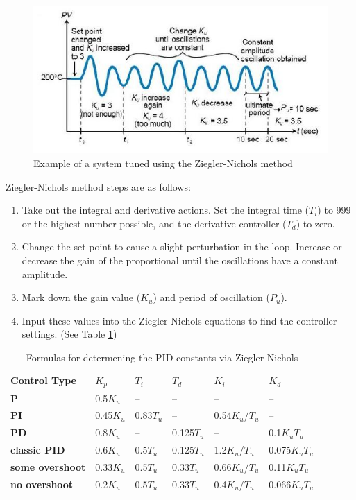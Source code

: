 \begin{figure}[H]
    \begin{center}
    \includegraphics[scale=0.7]{pictures/control/pidexample}
    \end{center}
    \caption{Example of a system tuned using the Ziegler-Nichols method\cite{LibrePID}}
    \label{fig:znmethod}
\end{figure}

Ziegler-Nichols method steps are as follows:
\begin{enumerate}
    \item 
    Take out the integral and derivative actions. Set the integral time ($T_i$) to 999 or the highest number possible, and the derivative controller ($T_d$) to zero.
    \item 
    Change the set point to cause a slight perturbation in the loop. Increase or decrease the gain of the proportional until the oscillations have a constant amplitude.
    \item 
    Mark down the gain value ($K_u$) and period of oscillation ($P_u$).
    \item 
    Input these values into the Ziegler-Nichols equations to find the controller settings. (See Table \ref*{table.pidconstants})
\end{enumerate}

\begin{table}[H]
    \begin{tabular}{llllll}
    \textbf{Control Type}   & $K_p$        & $T_i$     & $T_d$      & $K_i$           & $K_d$\\
    \textbf{P}              & 0.5$K_u$     & –         & –          & –               & –\\
    \textbf{PI}             & 0.45$K_u$    & 0.83$T_u$ & –          & 0.54$K_u$/$T_u$ & – \\
    \textbf{PD}             & 0.8$K_u$     & –         & 0.125$T_u$ & –               & 0.1$K_u$$T_u$ \\
    \textbf{classic PID}    & 0.6$K_u$     & 0.5$T_u$  & 0.125$T_u$ & 1.2$K_u$/$T_u$  & 0.075$K_u$$T_u$ \\
    \textbf{some overshoot} & 0.33$K_u$    & 0.5$T_u$  & 0.33$T_u$  & 0.66$K_u$/$T_u$ & 0.11$K_u$$T_u$ \\
    \textbf{no overshoot}   & 0.2$K_u$     & 0.5$T_u$  & 0.33$T_u$  & 0.4$K_u$/$T_u$  & 0.066$K_u$$T_u$ \\
    \end{tabular}
\caption{Formulas for determening the PID constants via Ziegler-Nichols}
\label{table.pidconstants}
\end{table}
